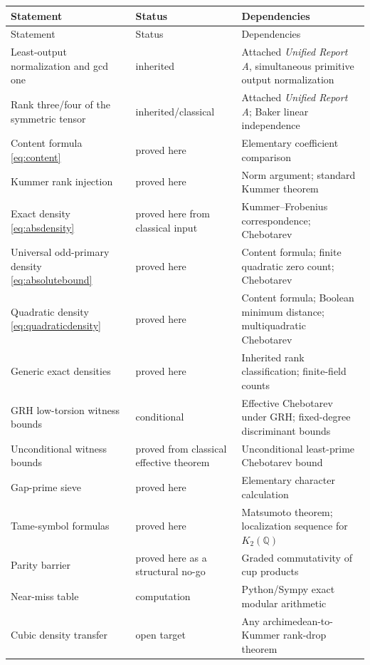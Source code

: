 \documentclass[11pt]{article}
\numberwithin{equation}{section}
\theoremstyle{definition}
\theoremstyle{remark}
\newcommand{\Q}{\mathbb Q}
\newcommand{\ReportA}{\textit{Unified Report A}}
\begin{document}
\begin{longtable}{@{}>{\raggedright\arraybackslash}p{}>{\raggedright\arraybackslash}p{}>{\raggedright\arraybackslash}p{}@{}}
\toprule
Statement & Status & Dependencies \\
\midrule
\endfirsthead
\toprule
Statement & Status & Dependencies \\
\midrule
\endhead
Least-output normalization and gcd one & inherited & Attached \ReportA, simultaneous primitive output normalization \\
Rank three/four of the symmetric tensor & inherited/classical & Attached \ReportA; Baker linear independence \\
Content formula \eqref{eq:content} & proved here & Elementary coefficient comparison \\
Kummer rank injection & proved here & Norm argument; standard Kummer theorem \\
Exact density \eqref{eq:absdensity} & proved here from classical input & Kummer--Frobenius correspondence; Chebotarev \\
Universal odd-primary density \eqref{eq:absolutebound} & proved here & Content formula; finite quadratic zero count; Chebotarev \\
Quadratic density \eqref{eq:quadraticdensity} & proved here & Content formula; Boolean minimum distance; multiquadratic Chebotarev \\
Generic exact densities & proved here & Inherited rank classification; finite-field counts \\
GRH low-torsion witness bounds & conditional & Effective Chebotarev under GRH; fixed-degree discriminant bounds \\
Unconditional witness bounds & proved from classical effective theorem & Unconditional least-prime Chebotarev bound \\
Gap-prime sieve & proved here & Elementary character calculation \\
Tame-symbol formulas & proved here & Matsumoto theorem; localization sequence for \(K_2(\Q)\) \\
Parity barrier & proved here as a structural no-go & Graded commutativity of cup products \\
Near-miss table & computation & Python/Sympy exact modular arithmetic \\
Cubic density transfer & open target & Any archimedean-to-Kummer rank-drop theorem \\
\bottomrule
\end{longtable}
\end{document}
